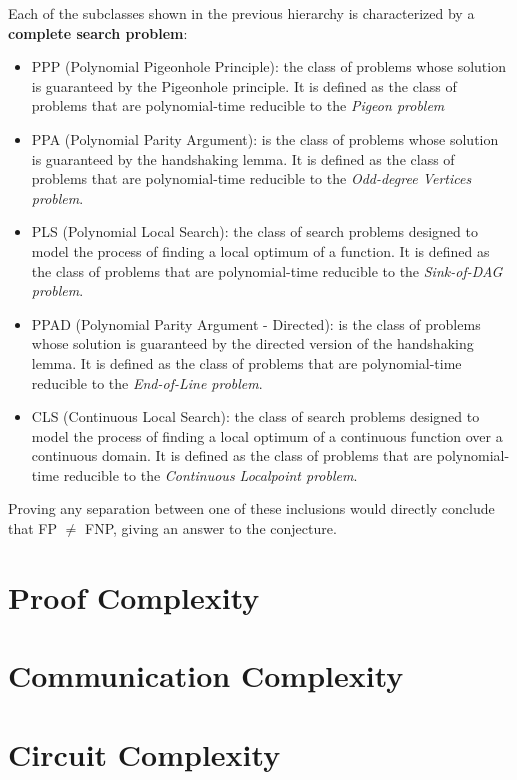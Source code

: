 Each of the subclasses shown in the previous hierarchy is characterized by a \textbf{complete search problem}:
\begin{itemize}
    \item \textsf{PPP} (Polynomial Pigeonhole Principle): the class of problems whose solution is guaranteed by the Pigeonhole principle. It is defined as the class of problems that are polynomial-time reducible to the \textit{Pigeon problem}
    
    
    \item \textsf{PPA} (Polynomial Parity Argument): is the class of problems whose solution is guaranteed by the handshaking lemma. It is defined as the class of problems that are polynomial-time reducible to the \textit{Odd-degree Vertices problem}.
    
    \item \textsf{PLS} (Polynomial Local Search): the class of search problems designed to model the process of finding a local optimum of a function. It is defined as the class of problems that are polynomial-time reducible to the \textit{Sink-of-DAG problem}.
    
    \item \textsf{PPAD} (Polynomial Parity Argument - Directed): is the class of problems whose solution is guaranteed by the directed version of the handshaking lemma. It is defined as the class of problems that are polynomial-time reducible to the \textit{End-of-Line problem}.
    
    \item \textsf{CLS} (Continuous Local Search): the class of search problems designed to model the process of finding a local optimum of a continuous function over a continuous domain. It is defined as the class of problems that are polynomial-time reducible to the \textit{Continuous Localpoint problem}.
\end{itemize}

Proving any separation between one of these inclusions would directly conclude that \textsf{FP} $\neq$ \textsf{FNP}, giving an answer to the conjecture.
 
\newpage

\section{Proof Complexity}

\section{Communication Complexity}

\section{Circuit Complexity}

\cleardoublepage